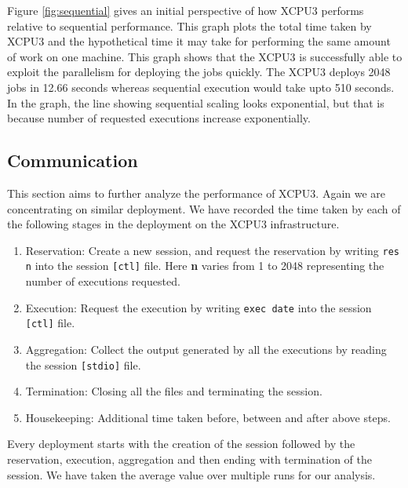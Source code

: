 %
%
Figure \ref{fig:sequential} gives an initial perspective of how XCPU3 performs
relative to sequential performance.  This graph plots the total time taken by
XCPU3 and the hypothetical time it may take for performing the same amount of
work on one machine.  This graph shows that the XCPU3 is successfully able to
exploit the parallelism for deploying the jobs quickly. The XCPU3 deploys 2048
jobs in 12.66 seconds whereas sequential execution would take upto 510 seconds.
In the graph, the line showing sequential scaling looks exponential, but that is
because number of requested executions increase exponentially.

\subsection{Communication}

This section aims to further analyze the performance of XCPU3.  Again we are 
concentrating on similar deployment.  We have recorded the time taken by each
of the following stages in the deployment on the XCPU3 infrastructure.

\begin{enumerate}
\item Reservation: Create a new session, and request the reservation by writing
\texttt{res n} into the session \texttt{[ctl]} file.  Here \textbf{n} varies
from 1 to 2048 representing the number of executions requested. 

\item Execution: Request the execution by writing \texttt{exec date} into the
session \texttt{[ctl]} file.

\item Aggregation: Collect the output generated by all the executions by reading
the session \texttt{[stdio]} file.

\item Termination: Closing all the files and terminating the session.

\item Housekeeping: Additional time taken before, between and after above steps.
\end{enumerate}
Every deployment starts with the creation of the session followed by the
reservation, execution, aggregation and then ending with termination of the
session.  We have taken the average value over multiple runs for our analysis.

